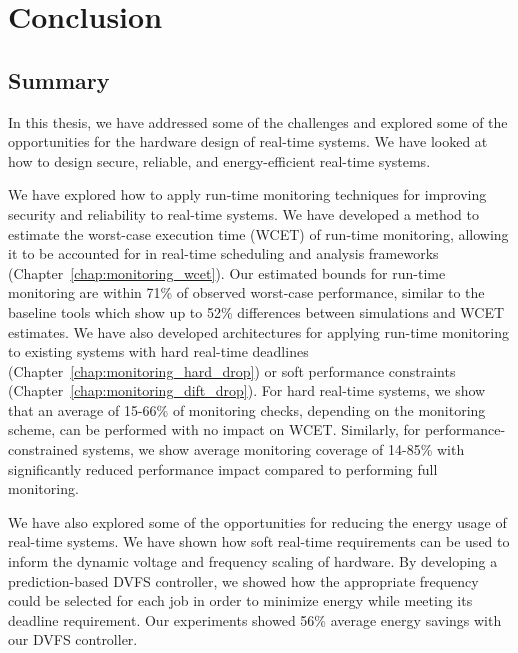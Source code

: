 \chapter{Conclusion}
\label{chap:conclusion}

\section{Summary}

In this thesis, we have addressed some of the challenges and explored some of
the opportunities for the hardware design of real-time systems. We have looked
at how to design secure, reliable, and energy-efficient real-time systems.

We have explored how to apply run-time monitoring techniques for improving
security and reliability to real-time systems. We have developed a method
to estimate the worst-case execution time (WCET) of run-time monitoring,
allowing it to be accounted for in real-time scheduling and analysis frameworks
(Chapter~\ref{chap:monitoring_wcet}). Our estimated bounds for run-time
monitoring are within 71\% of observed worst-case performance, similar to the
baseline tools which show up to 52\% differences between simulations and WCET
estimates. We have also developed architectures for applying run-time
monitoring to existing systems with hard real-time deadlines
(Chapter~\ref{chap:monitoring_hard_drop}) or soft performance constraints
(Chapter~\ref{chap:monitoring_dift_drop}). For hard real-time systems, we show
that an average of 15-66\% of monitoring checks, depending on the monitoring
scheme, can be performed with no impact on WCET. Similarly, for
performance-constrained systems, we show average monitoring coverage of 14-85\%
with significantly reduced performance impact compared to performing full
monitoring.

We have also explored some of the opportunities for reducing the energy usage
of real-time systems. We have shown how soft real-time requirements can be used
to inform the dynamic voltage and frequency scaling of hardware. By developing
a prediction-based DVFS controller, we showed how the appropriate frequency
could be selected for each job in order to minimize energy while meeting its
deadline requirement.  Our experiments showed 56\% average energy savings with
our DVFS controller.


